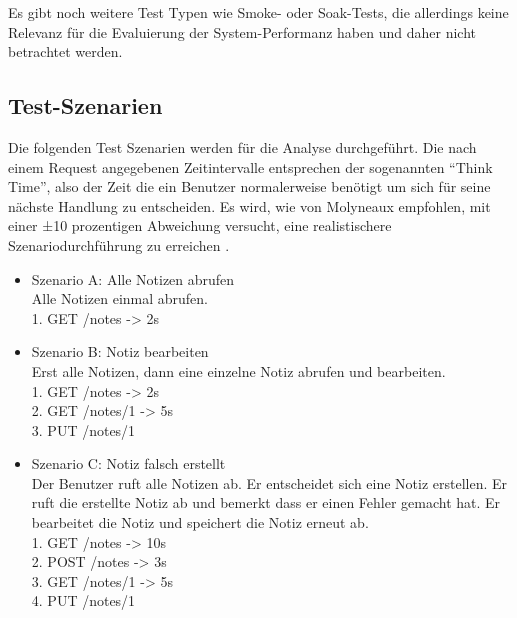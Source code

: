 Es gibt noch weitere Test Typen wie Smoke- oder Soak-Tests, die allerdings keine Relevanz für die Evaluierung der System-Performanz haben und daher nicht betrachtet werden.

\subsection{Test-Szenarien}
Die folgenden Test Szenarien werden für die Analyse durchgeführt. Die nach einem Request angegebenen Zeitintervalle entsprechen der sogenannten "`Think Time"', also der Zeit die ein Benutzer normalerweise benötigt um sich für seine nächste Handlung zu entscheiden. Es wird, wie von Molyneaux empfohlen, mit einer ±10 prozentigen Abweichung versucht, eine realistischere  Szenariodurchführung zu erreichen \cite{molyneaux_art_2014}.
\begin{itemize}
    \item Szenario A: Alle Notizen abrufen \\
        Alle Notizen einmal abrufen. \\
        1. GET /notes -> 2s     \\

    \item Szenario B: Notiz bearbeiten \\
        Erst alle Notizen, dann eine einzelne Notiz abrufen und bearbeiten. \\
        1. GET /notes -> 2s     \\
        2. GET /notes/1 -> 5s   \\
        3. PUT /notes/1         \\
        
    \item Szenario C: Notiz falsch erstellt \\
    Der Benutzer ruft alle Notizen ab. Er entscheidet sich eine Notiz erstellen. Er ruft die erstellte Notiz ab und bemerkt dass er einen Fehler gemacht hat. Er bearbeitet die Notiz und speichert die Notiz erneut ab. \\
        1. GET /notes   -> 10s  \\
        2. POST /notes  -> 3s   \\
        3. GET /notes/1 -> 5s   \\
        4. PUT /notes/1
\end{itemize}


